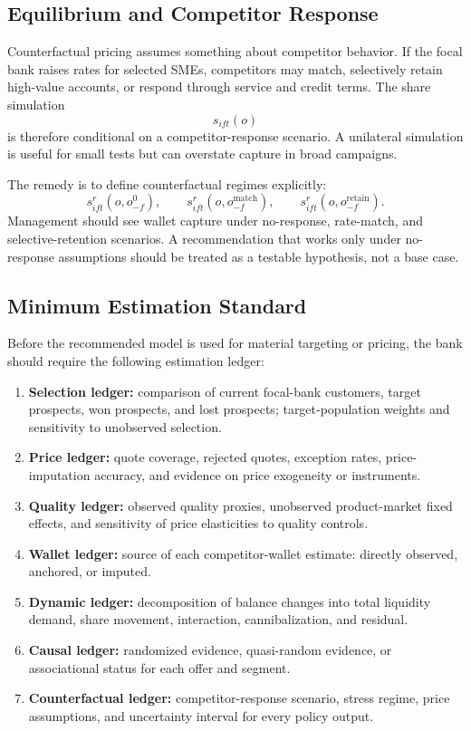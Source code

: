 \documentclass[11pt]{article}
\begin{document}
\subsection{Equilibrium and Competitor Response}

Counterfactual pricing assumes something about competitor behavior. If the
focal bank raises rates for selected SMEs, competitors may match, selectively
retain high-value accounts, or respond through service and credit terms. The
share simulation
\[
  s_{ift}(o)
\]
is therefore conditional on a competitor-response scenario. A unilateral
simulation is useful for small tests but can overstate capture in broad
campaigns.

The remedy is to define counterfactual regimes explicitly:
\[
  s_{ift}^{r}(o,o_{-f}^{0}),\qquad
  s_{ift}^{r}(o,o_{-f}^{\mathrm{match}}),\qquad
  s_{ift}^{r}(o,o_{-f}^{\mathrm{retain}}).
\]
Management should see wallet capture under no-response, rate-match, and
selective-retention scenarios. A recommendation that works only under
no-response assumptions should be treated as a testable hypothesis, not a base
case.

\subsection{Minimum Estimation Standard}

Before the recommended model is used for material targeting or pricing, the
bank should require the following estimation ledger:

\begin{enumerate}[leftmargin=*]
  \item \textbf{Selection ledger:} comparison of current focal-bank customers,
  target prospects, won prospects, and lost prospects; target-population weights
  and sensitivity to unobserved selection.
  \item \textbf{Price ledger:} quote coverage, rejected quotes, exception rates,
  price-imputation accuracy, and evidence on price exogeneity or instruments.
  \item \textbf{Quality ledger:} observed quality proxies, unobserved
  product-market fixed effects, and sensitivity of price elasticities to quality
  controls.
  \item \textbf{Wallet ledger:} source of each competitor-wallet estimate:
  directly observed, anchored, or imputed.
  \item \textbf{Dynamic ledger:} decomposition of balance changes into total
  liquidity demand, share movement, interaction, cannibalization, and residual.
  \item \textbf{Causal ledger:} randomized evidence, quasi-random evidence, or
  associational status for each offer and segment.
  \item \textbf{Counterfactual ledger:} competitor-response scenario, stress
  regime, price assumptions, and uncertainty interval for every policy output.
\end{enumerate}
\end{document}
